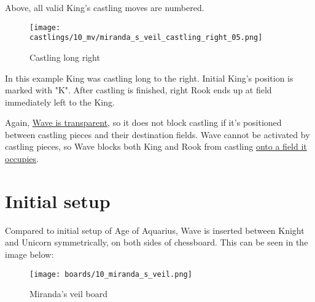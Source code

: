 Above, all valid King's castling moves are numbered.

\vspace*{-0.7\baselineskip}
\noindent
\begin{figure}[!h]
\texttt{[image: castlings/10\_mv/miranda\_s\_veil\_castling\_right\_05.png]}
\caption{Castling long right}
\label{fig:miranda_s_veil_castling_right_05}
\end{figure}

In this example King was castling long to the right. Initial King's position is marked with "K".
After castling is finished, right Rook ends up at field immediately left to the King.

Again, \hyperref[fig:scn_mv_07_wave_is_transparent]{Wave is transparent}, so it does
not block castling if it's positioned between castling pieces and their destination
fields.
Wave cannot be activated by castling pieces, so Wave blocks both King and Rook from castling
\hyperref[fig:scn_mv_11_wave_block_castling_rook]{onto a field it occupies}.

\clearpage %

\section*{Initial setup}
\label{sec:Miranda's veil/Initial setup}

Compared to initial setup of Age of Aquarius, Wave is inserted between Knight and Unicorn
symmetrically, on both sides of chessboard. This can be seen in the image below:

\noindent
\begin{figure}[h]
\texttt{[image: boards/10\_miranda\_s\_veil.png]}
\caption{Miranda's veil board}
\label{fig:10_miranda_s_veil}
\end{figure}

\clearpage %
